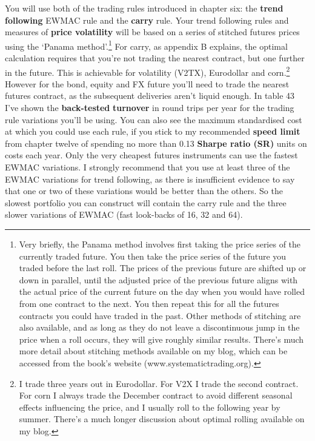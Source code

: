 You will use both of the trading rules introduced in chapter six: the \textbf{trend following} EWMAC rule and the \textbf{carry} rule. Your trend following rules and measures of \textbf{price volatility} will be based on a series of stitched futures prices using the ‘Panama method'.\footnote{Very briefly, the Panama method involves first taking the price series of the currently traded future. You then take the price series of the future you traded before the last roll. The prices of the previous future are shifted up or down in parallel, until the adjusted price of the previous future aligns with the actual price of the current future on the day when you would have rolled from one contract to the next. You then repeat this for all the futures contracts you could have traded in the past. Other methods of stitching are also available, and as long as they do not leave a discontinuous jump in the price when a roll occurs, they will give roughly similar results. There's much more detail about stitching methods available on my blog, which can be accessed from the book's website (www.systematictrading.org).} For carry, as appendix B explains, the optimal calculation requires that you're not trading the nearest contract, but one further in the future. This is achievable for volatility (V2TX), Eurodollar and corn.\footnote{I trade three years out in Eurodollar. For V2X I trade the second contract. For corn I always trade the December contract to avoid different seasonal effects influencing the price, and I usually roll to the following year by summer. There's a much longer discussion about optimal rolling available on my blog.} However for the bond, equity and FX future you'll need to trade the nearest futures contract, as the subsequent deliveries aren't liquid enough. In table 43 I've shown the \textbf{back-tested} \textbf{turnover} in round trips per year for the trading rule variations you'll be using. You can also see the maximum standardised cost at which you could use each rule, if you stick to my recommended \textbf{speed limit} from chapter twelve of spending no more than 0.13 \textbf{Sharpe ratio (SR)} units on costs each year. Only the very cheapest futures instruments can use the fastest EWMAC variations. I strongly recommend that you use at least three of the EWMAC variations for trend following, as there is insufficient evidence to say that one or two of these variations would be better than the others. So the slowest portfolio you can construct will contain the carry rule and the three slower variations of EWMAC (fast look-backs of 16, 32 and 64).

